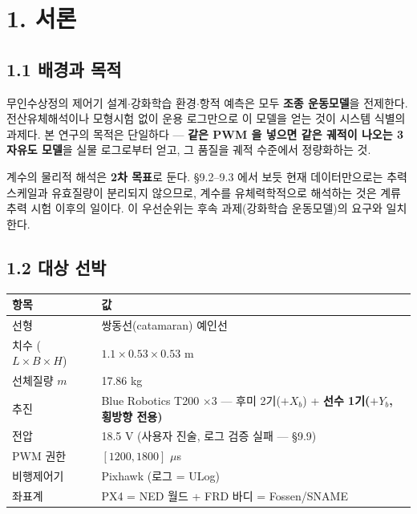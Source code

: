 \documentclass[10pt,a4paper]{article}
\begin{document}
\section*{1. 서론}

\subsection*{1.1 배경과 목적}

무인수상정의 제어기 설계$\cdot$강화학습 환경$\cdot$항적 예측은 모두 \textbf{조종 운동모델}을 전제한다. 전산유체해석이나 모형시험 없이 운용 로그만으로 이 모델을 얻는 것이 시스템 식별의 과제다. 본 연구의 목적은 단일하다 --- \textbf{같은 PWM 을 넣으면 같은 궤적이 나오는 3자유도 모델}을 실물 로그로부터 얻고, 그 품질을 궤적 수준에서 정량화하는 것.

계수의 물리적 해석은 \textbf{2차 목표}로 둔다. \S{}9.2--9.3 에서 보듯 현재 데이터만으로는 추력 스케일과 유효질량이 분리되지 않으므로, 계수를 유체력학적으로 해석하는 것은 계류추력 시험 이후의 일이다. 이 우선순위는 후속 과제(강화학습 운동모델)의 요구와 일치한다.

\subsection*{1.2 대상 선박}

\begin{center}\footnotesize\setlength{\tabcolsep}{3pt}
\begin{tabular}{@{}ll@{}}
\toprule
\textbf{항목} & \textbf{값} \\
\midrule
선형 & 쌍동선(catamaran) 예인선 \\
치수 ($L \times B \times H$) & $1.1 \times 0.53 \times 0.53$ m \\
선체질량 $m$ & 17.86 kg \\
추진 & Blue Robotics T200 $\times$3 --- 후미 2기($+X_b$) + \textbf{선수 1기($+Y_b$, 횡방향 전용)} \\
전압 & 18.5 V (사용자 진술, 로그 검증 실패 --- \S{}9.9) \\
PWM 권한 & $[1200, 1800]$ $\mu$s \\
비행제어기 & Pixhawk (로그 = ULog) \\
좌표계 & PX4 = NED 월드 + FRD 바디 = Fossen/SNAME \\
\bottomrule
\end{tabular}
\end{center}
\end{document}
